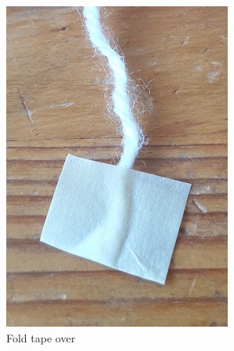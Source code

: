 \documentclass[openany]{book}
\begin{document}
\begin{figure}[H]
\begin{subfigure}[t]{.3\textwidth}
\includegraphics[width=.9\textwidth]{pic/M2}
\caption{Fold tape over}
\end{subfigure}
%
\begin{subfigure}[t]{.3\textwidth}

\end{subfigure}
\end{figure}
\end{document}
